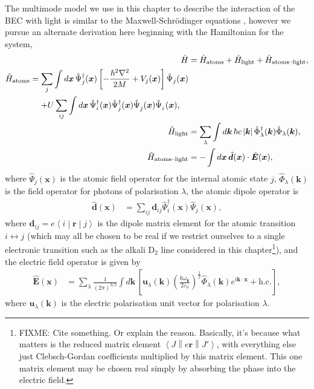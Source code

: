 The multimode model we use in this chapter to describe the interaction of the BEC with light is similar to the Maxwell-Schrödinger equations \citep{Zobay:2005,Zobay:2006}, however we pursue an alternate derivation here beginning with the Hamiltonian for the system,
\begin{subequations}
    \label{OpticalPumping:AtomLightHamiltonian}
    \begin{align}
        \hat{H} &= \hat{H}_\text{atoms} + \hat{H}_\text{light} + \hat{H}_\text{atoms--light}, \\
        \begin{split}
            \hat{H}_\text{atoms} &= \sum_j \int d \bm{x}\, \hat{\Psi}_j^\dagger(\bm{x}) \left[ - \frac{\hbar^2 \nabla^2}{2 M} + V_j(\bm{x}) \right] \hat{\Psi}_j(\bm{x}) \\
            &\relphantom{=} + U \sum_{ij}\int d \bm{x}\, \hat{\Psi}_i^\dagger(\bm{x}) \hat{\Psi}_j^\dagger(\bm{x}) \hat{\Psi}_j^{\phantom{\dagger}}(\bm{x}) \hat{\Psi}_i^{\phantom{\dagger}}(\bm{x}),
        \end{split}\\
        \hat{H}_\text{light} &= \sum_\lambda \int d \bm{k}\, \hbar c \abs{\bm{k}} \hat{\Phi}_\lambda^\dagger(\bm{k}) \hat{\Phi}_\lambda(\bm{k}), \\
        \hat{H}_\text{atoms--light} &= - \int d \bm{x}\, \hat{\bm{d}}(\bm{x}) \cdot \hat{\bm{E}}(\bm{x}), \label{OpticalPumping:AtomLightCouplingHamiltonian}
    \end{align}
\end{subequations}
where $\hat{\Psi}_j(\bm{x})$ is the atomic field operator for the internal atomic state $j$, $\hat{\Phi}_\lambda(\bm{k})$ is the field operator for photons of polarisation $\lambda$, the atomic dipole operator is
\begin{align}
    \hat{\bm{d}}(\bm{x}) &= \sum_{ij}\bm{d}_{ij} \hat{\Psi}_i^\dagger(\bm{x}) \hat{\Psi}_j^{\phantom{\dagger}}(\bm{x}),
\end{align}
where $\bm{d}_{ij} = e\left<i\middle|\bm{r}\middle|j\right>$ is the dipole matrix element for the atomic transition $i \leftrightarrow j$ (which may all be chosen to be real if we restrict ourselves to a single electronic transition such as the alkali D$_2$ line considered in this chapter\footnote{FIXME: Cite something.  Or explain the reason.  Basically, it's because what matters is the reduced matrix element $\left<J\middle\|e \bm{r} \middle\|J'\right>$, with everything else just Clebsch-Gordan coefficients multiplied by this matrix element.  This one matrix element may be chosen real simply by absorbing the phase into the electric field.}), and the electric field operator is given by
\begin{align}
    \hat{\bm{E}}(\bm{x}) &= \sum_\lambda \frac{1}{(2\pi)^{3/2}} \int d \bm{k}\, \left[\bm{u}_\lambda(\bm{k}) \left(\frac{\hbar \omega_{\bm{k}}}{2\varepsilon_0} \right)^{\frac{1}{2}} \hat{\Phi}_\lambda(\bm{k}) e^{i \bm{k} \cdot \bm{x}} + \text{h.c.}\right],
\end{align}
where $\bm{u}_\lambda(\bm{k})$ is the electric polarisation unit vector for polarisation $\lambda$.

